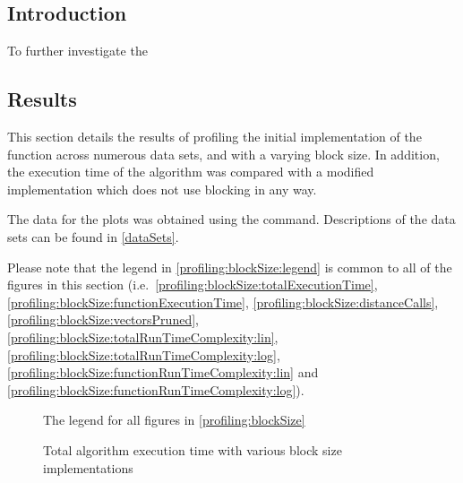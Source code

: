\subsection{Introduction}
\label{profiling:blockSize:introduction}
To further investigate the

\subsection{Results}
\label{profiling:blockSize:results}
This section details the results of profiling the initial 
implementation of the  function across
numerous data sets, and with a varying block size. In addition, the execution
time of the algorithm was compared with a modified implementation which does not
use blocking in any way.

The data for the plots was obtained using the 
 command. Descriptions of the data sets can be found in
\autoref{dataSets}.


Please note that the legend in \autoref{profiling:blockSize:legend} is common to
all of the figures in this section (i.e.\
\autoref{profiling:blockSize:totalExecutionTime},
\autoref{profiling:blockSize:functionExecutionTime},
\autoref{profiling:blockSize:distanceCalls},
\autoref{profiling:blockSize:vectorsPruned},
\autoref{profiling:blockSize:totalRunTimeComplexity:lin},
\autoref{profiling:blockSize:totalRunTimeComplexity:log},
\autoref{profiling:blockSize:functionRunTimeComplexity:lin} and
\autoref{profiling:blockSize:functionRunTimeComplexity:log}).

\begin{figure}
    \centering
    
    \caption[Block size profiling legend]
        {The legend for all figures in \autoref{profiling:blockSize}}
    \label{profiling:blockSize:legend}
\end{figure}

\begin{figure}
    \centering
    
    \caption{Total algorithm execution time with various block size
        implementations}
    \label{profiling:blockSize:totalExecutionTime}
\end{figure}

